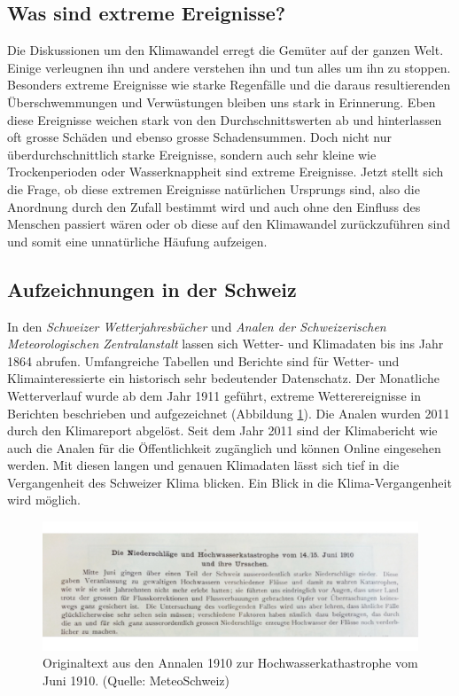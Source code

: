 \begin{refsection}
\section{Was sind extreme Ereignisse?}
Die Diskussionen um den Klimawandel erregt die Gemüter auf der ganzen Welt. Einige verleugnen ihn und andere verstehen ihn und tun alles um ihn zu stoppen. Besonders extreme Ereignisse wie starke Regenfälle und die daraus resultierenden Überschwemmungen und Verwüstungen bleiben uns stark in Erinnerung.
Eben diese Ereignisse weichen stark von den Durchschnittswerten ab und hinterlassen oft grosse Schäden und ebenso grosse Schadensummen. Doch nicht nur überdurchschnittlich starke Ereignisse, sondern auch sehr kleine wie Trockenperioden oder Wasserknappheit sind extreme Ereignisse.
Jetzt stellt sich die Frage, ob diese extremen Ereignisse natürlichen Ursprungs sind, also  die Anordnung durch den Zufall bestimmt wird und auch ohne den Einfluss des Menschen passiert wären oder ob diese auf den Klimawandel zurückzuführen sind und somit eine unnatürliche Häufung aufzeigen.


\subsection{Aufzeichnungen in der Schweiz}
In den \textit{Schweizer Wetterjahresbücher} und \textit{Analen der Schweizerischen Meteorologischen Zentralanstalt} lassen sich Wetter- und Klimadaten bis ins Jahr 1864 abrufen. Umfangreiche Tabellen und Berichte sind für Wetter- und Klimainteressierte ein historisch sehr bedeutender Datenschatz. 
Der Monatliche Wetterverlauf wurde ab dem Jahr 1911 geführt, extreme Wetterereignisse in Berichten beschrieben und aufgezeichnet (Abbildung \ref{Analen}). Die Analen wurden 2011 durch den Klimareport abgelöst. Seit dem Jahr 2011 sind der Klimabericht wie auch die Analen für die Öffentlichkeit zugänglich und können Online eingesehen werden.
Mit diesen langen und genauen Klimadaten lässt sich tief in die Vergangenheit des Schweizer Klima blicken. Ein Blick in die Klima-Vergangenheit wird möglich.

\begin{figure}
\centering
\includegraphics[width=\hsize]{extrem/Analen.jpg}
\caption{Originaltext aus den Annalen 1910 zur Hochwasserkathastrophe vom Juni 1910. (Quelle: MeteoSchweiz)}
\label{Analen}
\end{figure}



\end{refsection}
